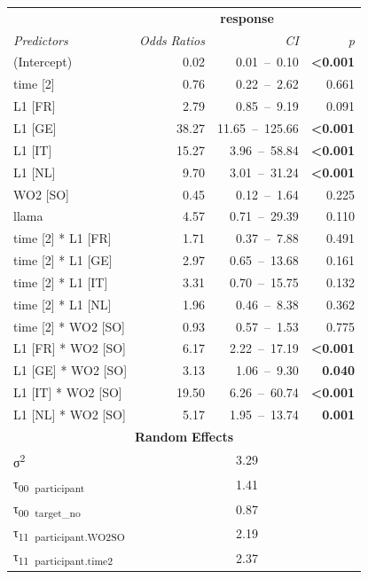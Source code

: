 \begin{table}
    \begin{tabularx}{\textwidth}{Xrrr}
    \lsptoprule
    \textbf{~} & \multicolumn{3}{c}{ \textbf{response}}\\
    \textit{Predictors} & \textit{Odds} \textit{Ratios} & \textit{CI} & \textit{p}\\
    \midrule
    (Intercept) & 0.02 & 0.01~–~0.10 & \textbf{<0.001}\\
    time [2] & 0.76 & 0.22~–~2.62 & 0.661\\
    L1 [FR] & 2.79 & 0.85~–~9.19 & 0.091\\
    L1 [GE] & 38.27 & 11.65~–~125.66 & \textbf{<0.001}\\
    L1 [IT] & 15.27 & 3.96~–~58.84 & \textbf{<0.001}\\
    L1 [NL] & 9.70 & 3.01~–~31.24 & \textbf{<0.001}\\
    WO2 [SO] & 0.45 & 0.12~–~1.64 & 0.225\\
    llama & 4.57 & 0.71~–~29.39 & 0.110\\
    time [2] * L1 [FR] & 1.71 & 0.37~–~7.88 & 0.491\\
    time [2] * L1 [GE] & 2.97 & 0.65~–~13.68 & 0.161\\
    time [2] * L1 [IT] & 3.31 & 0.70~–~15.75 & 0.132\\
    time [2] * L1 [NL] & 1.96 & 0.46~–~8.38 & 0.362\\
    time [2] * WO2 [SO] & 0.93 & 0.57~–~1.53 & 0.775\\
    L1 [FR] * WO2 [SO] & 6.17 & 2.22~–~17.19 & \textbf{<0.001}\\
    L1 [GE] * WO2 [SO] & 3.13 & 1.06~–~9.30 & \textbf{0.040}\\
    L1 [IT] * WO2 [SO] & 19.50 & 6.26~–~60.74 & \textbf{<0.001}\\
    L1 [NL] * WO2 [SO] & 5.17 & 1.95~–~13.74 & \textbf{0.001}\\
    \multicolumn{4}{c}{\textbf{Random} \textbf{Effects}}\\
    σ\textsuperscript{2} & \multicolumn{3}{c}{3.29}\\
    τ\textsubscript{00}~\textsubscript{participant} & \multicolumn{3}{c}{1.41}\\
    τ\textsubscript{00}~\textsubscript{target\_no} & \multicolumn{3}{c}{0.87}\\
    τ\textsubscript{11}~\textsubscript{participant.WO2SO} & \multicolumn{3}{c}{2.19}\\
    τ\textsubscript{11}~\textsubscript{participant.time2} & \multicolumn{3}{c}{2.37}\\

\end{tabularx}
\end{table}
